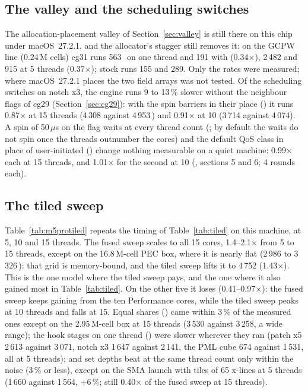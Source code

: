 \subsection*{The valley and the scheduling switches}
The allocation-placement valley of Section~\ref{sec:valley} is still there on this chip under macOS~27.2.1, and the
allocator's stagger still removes it: on the GCPW line (0.24\,M cells) cg31 runs 563\,\MC\ on one thread and 191 with
 (0.34$\times$), 2\,482 and 915 at 5 threads (0.37$\times$); stock runs 155 and 289.
Only the rates were measured; where macOS~27.2.1 places the two field arrays was not tested. Of the scheduling switches
on notch x3, the engine runs 9 to 13\,\% slower without the neighbour flags of cg29 (Section~\ref{sec:cg29}): with
the spin barriers in their place () it runs 0.87$\times$ at 15 threads (4\,308 against 4\,953\,\MC) and
0.91$\times$ at 10 (3\,714 against 4\,074). A spin of 50\,$\mu$s on the flag waits at every thread count
(; by default the waits do not spin once the threads outnumber the
 cores) and the default QoS class in place of user-initiated () change nothing
measurable on a quiet machine: 0.99$\times$ each at 15 threads, and 1.01$\times$ for the second at 10
(, sections 5 and 6; 4 rounds each).

\subsection*{The tiled sweep}
Table~\ref{tab:m5protiled} repeats the timing of Table~\ref{tab:tiled} on this machine, at 5, 10 and 15 threads. The
fused sweep scales to all 15 cores, 1.4--2.1$\times$ from 5 to 15 threads, except on the 16.8\,M-cell PEC box, where
it is nearly flat (2\,986 to 3\,326\,\MC): that grid is memory-bound, and the tiled sweep lifts it to 4\,752
(1.43$\times$). This is the one model where the tiled sweep pays, and the one where it also gained most in
Table~\ref{tab:tiled}. On the other five it
loses (0.41--0.97$\times$): the fused sweep keeps gaining from the ten Performance cores, while the tiled sweep peaks
at 10 threads and falls at 15. Equal shares () came within 3\,\% of the measured ones except
on the 2.95\,M-cell box at 15 threads (3\,530 against 3\,258, a wide range); the hook stages on one thread
() were slower wherever they ran (patch x5 2\,613 against 3\,071, notch x3 1\,647
against 2\,141, the PML cube 674 against 1\,531, all at 5 threads); and set depths beat  at the same thread
count only within the noise (3\,\% or less), except on the SMA launch with tiles of 65 x-lines at 5 threads (1\,660
against 1\,564, +6\,\%; still 0.40$\times$ of the fused sweep at 15 threads).

